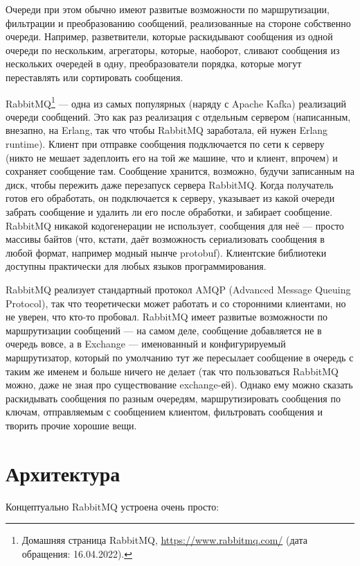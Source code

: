 \documentclass{../../text-style}
\begin{document}
Очереди при этом обычно имеют развитые возможности по маршрутизации, фильтрации и преобразованию сообщений, реализованные на стороне собственно очереди. Например, разветвители, которые раскидывают сообщения из одной очереди по нескольким, агрегаторы, которые, наоборот, сливают сообщения из нескольких очередей в одну, преобразователи порядка, которые могут переставлять или сортировать сообщения.

RabbitMQ\footnote{Домашняя страница RabbitMQ, \url{https://www.rabbitmq.com/} (дата обращения: 16.04.2022).} --- одна из самых популярных (наряду с Apache Kafka) реализаций очереди сообщений. Это как раз реализация с отдельным сервером (написанным, внезапно, на Erlang, так что чтобы RabbitMQ заработала, ей нужен Erlang runtime). Клиент при отправке сообщения подключается по сети к серверу (никто не мешает задеплоить его на той же машине, что и клиент, впрочем) и сохраняет сообщение там. Сообщение хранится, возможно, будучи записанным на диск, чтобы пережить даже перезапуск сервера RabbitMQ. Когда получатель готов его обработать, он подключается к серверу, указывает из какой очереди забрать сообщение и удалить ли его после обработки, и забирает сообщение. RabbitMQ никакой кодогенерации не использует, сообщения для неё --- просто массивы байтов (что, кстати, даёт возможность сериализовать сообщения в любой формат, например модный нынче protobuf). Клиентские библиотеки доступны практически для любых языков программирования.

RabbitMQ реализует стандартный протокол AMQP (Advanced Message Queuing Protocol), так что теоретически может работать и со сторонними клиентами, но не уверен, что кто-то пробовал. RabbitMQ имеет развитые возможности по маршрутизации сообщений --- на самом деле, сообщение добавляется не в очередь вовсе, а в Exchange --- именованный и конфигурируемый маршрутизатор, который по умолчанию тут же пересылает сообщение в очередь с таким же именем и больше ничего не делает (так что пользоваться RabbitMQ можно, даже не зная про существование exchange-ей). Однако ему можно сказать раскидывать сообщения по разным очередям, маршрутизировать сообщения по ключам, отправляемым с сообщением клиентом, фильтровать сообщения и творить прочие хорошие вещи.

\section{Архитектура}

Концептуально RabbitMQ устроена очень просто:
\end{document}
